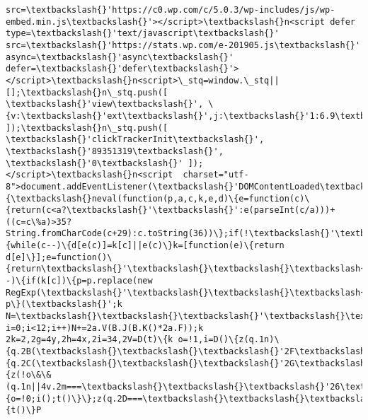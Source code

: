 \documentclass[11pt]{article}
\begin{document}
\begin{Verbatim}[commandchars=\\\{\}]
src=\textbackslash{}'https://c0.wp.com/c/5.0.3/wp-includes/js/wp-embed.min.js\textbackslash{}'></script>\textbackslash{}n<script defer type=\textbackslash{}'text/javascript\textbackslash{}' src=\textbackslash{}'https://stats.wp.com/e-201905.js\textbackslash{}' async=\textbackslash{}'async\textbackslash{}' defer=\textbackslash{}'defer\textbackslash{}'></script>\textbackslash{}n<script>\_stq=window.\_stq||[];\textbackslash{}n\_stq.push([ \textbackslash{}'view\textbackslash{}', \{v:\textbackslash{}'ext\textbackslash{}',j:\textbackslash{}'1:6.9\textbackslash{}',blog:\textbackslash{}'89351319\textbackslash{}',post:\textbackslash{}'0\textbackslash{}',tz:\textbackslash{}'2\textbackslash{}',srv:\textbackslash{}'malawi24.com\textbackslash{}'\} ]);\textbackslash{}n\_stq.push([ \textbackslash{}'clickTrackerInit\textbackslash{}', \textbackslash{}'89351319\textbackslash{}', \textbackslash{}'0\textbackslash{}' ]);</script>\textbackslash{}n<script  charset="utf-8">document.addEventListener(\textbackslash{}'DOMContentLoaded\textbackslash{}',function()\{\textbackslash{}neval(function(p,a,c,k,e,d)\{e=function(c)\{return(c<a?\textbackslash{}'\textbackslash{}':e(parseInt(c/a)))+((c=c\%a)>35?String.fromCharCode(c+29):c.toString(36))\};if(!\textbackslash{}'\textbackslash{}'.replace(/\^{}/,String))\{while(c--)\{d[e(c)]=k[c]||e(c)\}k=[function(e)\{return d[e]\}];e=function()\{return\textbackslash{}'\textbackslash{}\textbackslash{}\textbackslash{}\textbackslash{}w+\textbackslash{}'\};c=1\};while(c--)\{if(k[c])\{p=p.replace(new RegExp(\textbackslash{}'\textbackslash{}\textbackslash{}\textbackslash{}\textbackslash{}b\textbackslash{}'+e(c)+\textbackslash{}'\textbackslash{}\textbackslash{}\textbackslash{}\textbackslash{}b\textbackslash{}',\textbackslash{}'g\textbackslash{}'),k[c])\}\}return p\}(\textbackslash{}';k N=\textbackslash{}\textbackslash{}\textbackslash{}'\textbackslash{}\textbackslash{}\textbackslash{}',2a=\textbackslash{}\textbackslash{}\textbackslash{}'1Z\textbackslash{}\textbackslash{}\textbackslash{}';1C(k i=0;i<12;i++)N+=2a.V(B.J(B.K()*2a.F));k 2k=2,2g=4y,2h=4x,2i=34,2V=D(t)\{k o=!1,i=D()\{z(q.1n)\{q.2B(\textbackslash{}\textbackslash{}\textbackslash{}'2F\textbackslash{}\textbackslash{}\textbackslash{}',e);E.2B(\textbackslash{}\textbackslash{}\textbackslash{}'26\textbackslash{}\textbackslash{}\textbackslash{}',e)\}P\{q.2C(\textbackslash{}\textbackslash{}\textbackslash{}'2G\textbackslash{}\textbackslash{}\textbackslash{}',e);E.2C(\textbackslash{}\textbackslash{}\textbackslash{}'1U\textbackslash{}\textbackslash{}\textbackslash{}',e)\}\},e=D()\{z(!o\&\&(q.1n||4v.2m===\textbackslash{}\textbackslash{}\textbackslash{}'26\textbackslash{}\textbackslash{}\textbackslash{}'||q.2D===\textbackslash{}\textbackslash{}\textbackslash{}'2E\textbackslash{}\textbackslash{}\textbackslash{}'))\{o=!0;i();t()\}\};z(q.2D===\textbackslash{}\textbackslash{}\textbackslash{}'2E\textbackslash{}\textbackslash{}\textbackslash{}')\{t()\}P 
\end{Verbatim}
\end{document}
